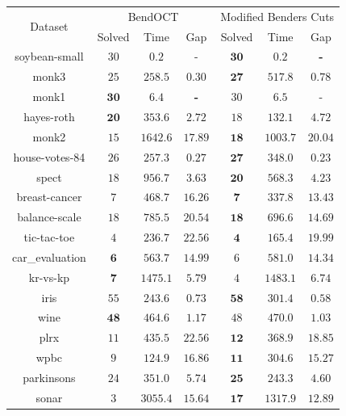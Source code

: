 \begin{tabular}{ccccccc}
\hline
\multirow{2}{*}{Dataset} & \multicolumn{3}{c}{BendOCT} & \multicolumn{3}{c}{Modified Benders Cuts}\\
  & Solved & Time & Gap & Solved & Time & Gap\\
\hline
soybean-small & $30$ & $0.2$ & - & $\mathbf{30}$ & $\mathbf{0.2}$ & \textbf{-}\\
monk3 & $25$ & $258.5$ & $0.30$ & $\mathbf{27}$ & $\mathbf{517.8}$ & $\mathbf{0.78}$\\
monk1 & $\mathbf{30}$ & $\mathbf{6.4}$ & \textbf{-} & $30$ & $6.5$ & -\\
hayes-roth & $\mathbf{20}$ & $\mathbf{353.6}$ & $\mathbf{2.72}$ & $18$ & $132.1$ & $4.72$\\
monk2 & $15$ & $1642.6$ & $17.89$ & $\mathbf{18}$ & $\mathbf{1003.7}$ & $\mathbf{20.04}$\\
house-votes-84 & $26$ & $257.3$ & $0.27$ & $\mathbf{27}$ & $\mathbf{348.0}$ & $\mathbf{0.23}$\\
spect & $18$ & $956.7$ & $3.63$ & $\mathbf{20}$ & $\mathbf{568.3}$ & $\mathbf{4.23}$\\
breast-cancer & $7$ & $468.7$ & $16.26$ & $\mathbf{7}$ & $\mathbf{337.8}$ & $\mathbf{13.43}$\\
balance-scale & $18$ & $785.5$ & $20.54$ & $\mathbf{18}$ & $\mathbf{696.6}$ & $\mathbf{14.69}$\\
tic-tac-toe & $4$ & $236.7$ & $22.56$ & $\mathbf{4}$ & $\mathbf{165.4}$ & $\mathbf{19.99}$\\
car\_evaluation & $\mathbf{6}$ & $\mathbf{563.7}$ & $\mathbf{14.99}$ & $6$ & $581.0$ & $14.34$\\
kr-vs-kp & $\mathbf{7}$ & $\mathbf{1475.1}$ & $\mathbf{5.79}$ & $4$ & $1483.1$ & $6.74$\\
\hline
iris & $55$ & $243.6$ & $0.73$ & $\mathbf{58}$ & $\mathbf{301.4}$ & $\mathbf{0.58}$\\
wine & $\mathbf{48}$ & $\mathbf{464.6}$ & $\mathbf{1.17}$ & $48$ & $470.0$ & $1.03$\\
plrx & $11$ & $435.5$ & $22.56$ & $\mathbf{12}$ & $\mathbf{368.9}$ & $\mathbf{18.85}$\\
wpbc & $9$ & $124.9$ & $16.86$ & $\mathbf{11}$ & $\mathbf{304.6}$ & $\mathbf{15.27}$\\
parkinsons & $24$ & $351.0$ & $5.74$ & $\mathbf{25}$ & $\mathbf{243.3}$ & $\mathbf{4.60}$\\
sonar & $3$ & $3055.4$ & $15.64$ & $\mathbf{17}$ & $\mathbf{1317.9}$ & $\mathbf{12.89}$\\

\end{tabular}
